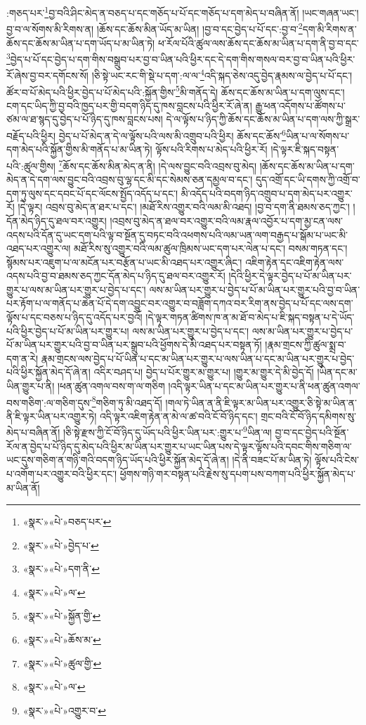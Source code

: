 :གཅད་པར་\footnote{«སྣར་»«པེ་»བཅད་པར་}བྱ་བའི་ཤིང་མེད་ན་བཅད་པ་དང་གཅོད་པ་པོ་དང་གཅོད་པ་དག་མེད་པ་བཞིན་ནོ། །ཡང་གཞན་ཡང་། བྱ་བ་ལ་སོགས་མི་རིགས་ན། །ཆོས་དང་ཆོས་མིན་ཡོད་མ་ཡིན། །བྱ་བ་དང་བྱེད་པ་པོ་དང་:བྱ་བ་\footnote{«སྣར་»«པེ་»བྱེད་པ་}དག་མི་རིགས་ན་ཆོས་དང་ཆོས་མ་ཡིན་པ་དག་ཡོད་པ་མ་ཡིན་ཏེ། ཕ་རོལ་པོའི་ཚུལ་ལས་ཆོས་དང་ཆོས་མ་ཡིན་པ་དག་ནི་བྱ་བ་དང་\footnote{«སྣར་»«པེ་»དག་ནི་}བྱེད་པ་པོ་དང་བྱེད་པ་དག་གིས་བསྒྲུབ་པར་བྱ་བ་ཡིན་པའི་ཕྱིར་དང་དེ་དག་གིས་གསལ་བར་བྱ་བ་ཡིན་པའི་ཕྱིར་རོ་ཞེས་བྱ་བར་དགོངས་སོ། །ཅི་སྟེ་ཡང་རང་གི་སྡེ་པ་དག་:ལ་ལ་\footnote{«སྣར་»«པེ་»ལ་}འདི་སྐད་ཅེས་འདུ་བྱེད་རྣམས་ལ་བྱེད་པ་པོ་དང་། ཚོར་བ་པོ་མེད་པའི་ཕྱིར་བྱེད་པ་པོ་མེད་པའི་:སྐྱོན་གྱིས་\footnote{«སྣར་»«པེ་»སྐྱོན་གྱི་}མི་གནོད་དེ། ཆོས་དང་ཆོས་མ་ཡིན་པ་དག་ལུས་དང་། ངག་དང་ཡིད་ཀྱི་བྱ་བའི་ཁྱད་པར་གྱི་བདག་ཉིད་དུ་ཁས་བླངས་པའི་ཕྱིར་རོ་ཞེ་ན། རྒྱུ་ཕན་འདོགས་པ་ཚོགས་པ་ཙམ་ལ་ཐ་སྙད་དུ་བྱེད་པ་པོ་ཉིད་དུ་ཁས་བླངས་པས། དེ་ལ་ལྟོས་པ་ཉིད་ཀྱི་ཆོས་དང་ཆོས་མ་ཡིན་པ་དག་ལས་ཀྱི་སྒྲར་བརྗོད་པའི་ཕྱིར། བྱེད་པ་པོ་མེད་ན་དེ་ལ་ལྟོས་པའི་ལས་མི་འགྲུབ་པའི་ཕྱིར། ཆོས་དང་ཆོས་\footnote{«སྣར་»«པེ་»ཆོས་མ་}ཡིན་པ་ལ་སོགས་པ་དག་མེད་པའི་སྐྱོན་གྱིས་མི་གནོད་པ་མ་ཡིན་ཏེ། ལྟོས་པའི་རིགས་པ་མེད་པའི་ཕྱིར་རོ། །དེ་ལྟར་ཇི་སྐད་བསྟན་པའི་:ཚུལ་གྱིས། \footnote{«སྣར་»«པེ་»ཚུལ་གྱི་}ཆོས་དང་ཆོས་མིན་མེད་ན་ནི། །དེ་ལས་བྱུང་བའི་འབྲས་བུ་མེད། །ཆོས་དང་ཆོས་མ་ཡིན་པ་དག་མེད་ན་དེ་དག་ལས་བྱུང་བའི་འབྲས་བུ་ལྷ་དང་མི་དང་སེམས་ཅན་དམྱལ་བ་དང་། དུད་འགྲོ་དང་ཡི་དགས་ཀྱི་འགྲོ་བ་དག་ཏུ་ལུས་དང་དབང་པོ་དང་ལོངས་སྤྱོད་འདོད་པ་དང་། མི་འདོད་པའི་བདག་ཉིད་འགྲུབ་པ་དག་མེད་པར་འགྱུར་རོ། །དེ་ལྟར། འབྲས་བུ་མེད་ན་ཐར་པ་དང་། །མཐོ་རིས་འགྱུར་བའི་ལམ་མི་འཐད། །བྱ་བ་དག་ནི་ཐམས་ཅད་ཀྱང་། །དོན་མེད་ཉིད་དུ་ཐལ་བར་འགྱུར། །འབྲས་བུ་མེད་ན་ཐལ་བར་འགྱུར་བའི་ལམ་རྣལ་འབྱོར་པ་དག་མྱ་ངན་ལས་འདས་པའི་དོན་དུ་ཡང་དག་པའི་ལྟ་བ་སྔོན་དུ་བཏང་བའི་འཕགས་པའི་ལམ་ཡན་ལག་བརྒྱད་པ་སྒོམ་པ་ཡང་མི་འཐད་པར་འགྱུར་ལ། མཐོ་རིས་སུ་འགྱུར་བའི་ལམ་ཚུལ་ཁྲིམས་ཡང་དག་པར་ལེན་པ་དང་། བསམ་གཏན་དང་། སྙོམས་པར་འཇུག་པ་ལ་མངོན་པར་བརྩོན་པ་ཡང་མི་འཐད་པར་འགྱུར་ཞིང་། འཇིག་རྟེན་དང་འཇིག་རྟེན་ལས་འདས་པའི་བྱ་བ་ཐམས་ཅད་ཀྱང་དོན་མེད་པ་ཉིད་དུ་ཐལ་བར་འགྱུར་རོ། །དེའི་ཕྱིར་དེ་ལྟར་བྱེད་པ་པོ་མ་ཡིན་པར་གྱུར་པ་ལས་མ་ཡིན་པར་གྱུར་པ་བྱེད་པ་དང་། ལས་མ་ཡིན་པར་གྱུར་པ་བྱེད་པ་པོ་མ་ཡིན་པར་གྱུར་པའི་བྱ་བ་ཡིན་པར་རྟོག་པ་ལ་གནོད་པ་ཆེན་པོ་དེ་དག་འབྱུང་བར་འགྱུར་བ་བཟློག་དཀའ་བར་རིག་ནས་བྱེད་པ་པོ་དང་ལས་དག་ལྟོས་པ་དང་བཅས་པ་ཉིད་དུ་འདོད་པར་བྱའོ། །དེ་ལྟར་གཏན་ཚིགས་ཁ་ན་མ་ཐོ་བ་མེད་པ་ཇི་སྐད་བསྟན་པ་དེ་ཡོད་པའི་ཕྱིར་བྱེད་པ་པོ་མ་ཡིན་པར་གྱུར་པ། ལས་མ་ཡིན་པར་གྱུར་པ་བྱེད་པ་དང་། ལས་མ་ཡིན་པར་གྱུར་པ་བྱེད་པ་པོ་མ་ཡིན་པར་གྱུར་པའི་བྱ་བ་ཡིན་པར་སྒྲུབ་པའི་ཕྱོགས་དེ་མི་འཐད་པར་བསྟན་ཏོ། །རྣམ་གྲངས་ཀྱི་ཚུལ་སྨྲ་བ་དག་ན་རེ། རྣམ་གྲངས་ལས་བྱེད་པ་པོ་ཡིན་པ་དང་མ་ཡིན་པར་གྱུར་པ་ལས་ཡིན་པ་དང་མ་ཡིན་པར་གྱུར་པ་བྱེད་པའི་ཕྱིར་སྐྱོན་མེད་དོ་ཞེ་ན། འདིར་བཤད་པ། བྱེད་པ་པོར་གྱུར་མ་གྱུར་པ། །གྱུར་མ་གྱུར་དེ་མི་བྱེད་དོ། །ཡིན་དང་མ་ཡིན་གྱུར་པ་ནི། །ཕན་ཚུན་འགལ་བས་ག་ལ་གཅིག །འདི་ལྟར་ཡིན་པ་དང་མ་ཡིན་པར་གྱུར་པ་ནི་ཕན་ཚུན་འགལ་བས་གཅིག་:ལ་གཅིག་དུས་\footnote{«སྣར་»«པེ་»ལ་}གཅིག་ཏུ་མི་འཐད་དོ། །གལ་ཏེ་ཡིན་ན་ནི་ཇི་ལྟར་མ་ཡིན་པར་འགྱུར་ཅི་སྟེ་མ་ཡིན་ན་ནི་ཇི་ལྟར་ཡིན་པར་འགྱུར་ཏེ། འདི་ལྟར་འཇིག་རྟེན་ན་མེ་ལ་ཚ་བའི་ངོ་བོ་ཉིད་དང་། གྲང་བའི་ངོ་བོ་ཉིད་དམིགས་སུ་མེད་པ་བཞིན་ནོ། །ཅི་སྟེ་རྫས་ཀྱི་ངོ་བོ་ཉིད་དུ་ཡོད་པའི་ཕྱིར་ཡིན་པར་:གྱུར་པ་\footnote{«སྣར་»«པེ་»འགྱུར་བ་}ཡིན་ལ། བྱ་བ་དང་བྱེད་པའི་སྔོན་རོལ་ན་བྱེད་པ་པོ་ཉིད་དུ་མེད་པའི་ཕྱིར་མ་ཡིན་པར་གྱུར་པ་ཡང་ཡིན་པས་དེ་ལྟར་ལྟོས་པའི་དབང་གིས་གཅིག་ལ་ཡང་དུས་གཅིག་ན་གཉི་གའི་བདག་ཉིད་ཡོད་པའི་ཕྱིར་སྐྱོན་མེད་དོ་ཞེ་ན། །དེ་ནི་བཟང་པོ་མ་ཡིན་ཏེ། ལྟོས་པའི་ངེས་པ་འགོག་པར་འགྱུར་བའི་ཕྱིར་དང་། ཕྱོགས་གཉི་གར་བསྟན་པའི་རྗེས་སུ་དཔག་པས་བཀག་པའི་ཕྱིར་སྐྱོན་མེད་པ་མ་ཡིན་ནོ། 
